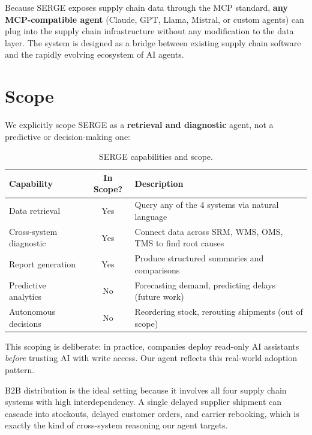 \documentclass[12pt,a4paper]{report}
\begin{document}
Because SERGE exposes supply chain data through the MCP standard, \textbf{any MCP-compatible agent} (Claude, GPT, Llama, Mistral, or custom agents) can plug into the supply chain infrastructure without any modification to the data layer. The system is designed as a bridge between existing supply chain software and the rapidly evolving ecosystem of AI agents.

\section{Scope}

We explicitly scope SERGE as a \textbf{retrieval and diagnostic} agent, not a predictive or decision-making one:

\begin{table}[H]
\centering\small
\caption{SERGE capabilities and scope.}
\begin{tabularx}{\textwidth}{@{} l c X @{}}
\toprule
\textbf{Capability} & \textbf{In Scope?} & \textbf{Description} \\
\midrule
Data retrieval          & Yes & Query any of the 4 systems via natural language \\
Cross-system diagnostic & Yes & Connect data across SRM, WMS, OMS, TMS to find root causes \\
Report generation       & Yes & Produce structured summaries and comparisons \\
Predictive analytics    & No  & Forecasting demand, predicting delays (future work) \\
Autonomous decisions    & No  & Reordering stock, rerouting shipments (out of scope) \\
\bottomrule
\end{tabularx}
\end{table}

This scoping is deliberate: in practice, companies deploy read-only AI assistants \textit{before} trusting AI with write access. Our agent reflects this real-world adoption pattern.

B2B distribution is the ideal setting because it involves all four supply chain systems with high interdependency. A single delayed supplier shipment can cascade into stockouts, delayed customer orders, and carrier rebooking, which is exactly the kind of cross-system reasoning our agent targets.

\end{document}
